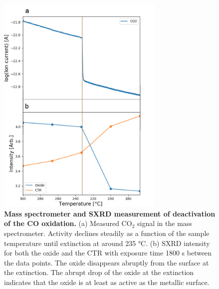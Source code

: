 \documentclass[aps,prl,groupedaddress,twocolumn]{revtex4-1}
\begin{document}


\begin{figure}
\includegraphics[width=8cm]{edited_1_fig.png}
\caption{\textbf{Mass spectrometer and SXRD measurement of deactivation of the CO oxidation.} (a) Measured CO$_2$ signal in the mass spectrometer. Activity declines steadily as a function of the sample temperature until extinction at around 235 $\si{\degreeCelsius}$. (b) SXRD intensity for both the oxide and the CTR with exposure time 1800 s between the data points. The oxide disappears abruptly from the surface at the extinction. The abrupt drop of the oxide at the extinction indicates that the oxide is at least as active as the metallic surface.}

\label{fig1}
\end{figure}
\end{document}
